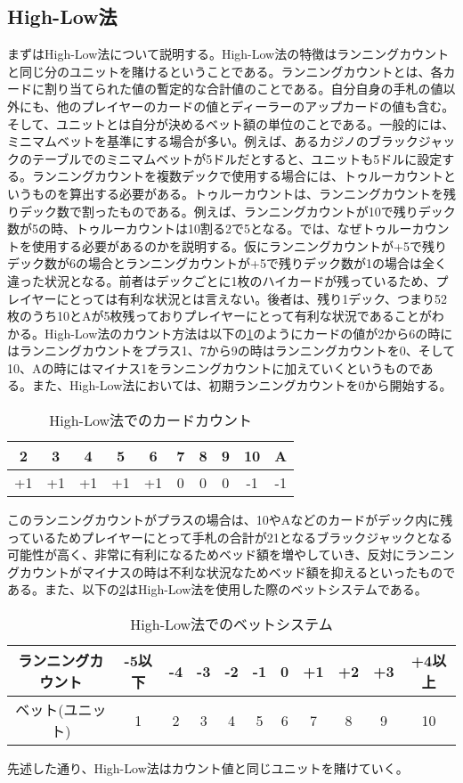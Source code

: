 \subsection{High-Low法}
まずはHigh-Low法について説明する。High-Low法の特徴はランニングカウントと同じ分のユニットを賭けるということである。ランニングカウントとは、各カードに割り当てられた値の暫定的な合計値のことである。自分自身の手札の値以外にも、他のプレイヤーのカードの値とディーラーのアップカードの値も含む。そして、ユニットとは自分が決めるベット額の単位のことである。一般的には、ミニマムベットを基準にする場合が多い。例えば、あるカジノのブラックジャックのテーブルでのミニマムベットが5ドルだとすると、ユニットも5ドルに設定する。ランニングカウントを複数デックで使用する場合には、トゥルーカウントというものを算出する必要がある。トゥルーカウントは、ランニングカウントを残りデック数で割ったものである。例えば、ランニングカウントが10で残りデック数が5の時、トゥルーカウントは10割る2で5となる。では、なぜトゥルーカウントを使用する必要があるのかを説明する。仮にランニングカウントが+5で残りデック数が6の場合とランニングカウントが+5で残りデック数が1の場合は全く違った状況となる。前者はデックごとに1枚のハイカードが残っているため、プレイヤーにとっては有利な状況とは言えない。後者は、残り1デック、つまり52枚のうち10とAが5枚残っておりプレイヤーにとって有利な状況であることがわかる。High-Low法のカウント方法は以下の\ref{hlc}のようにカードの値が2から6の時にはランニングカウントをプラス1、7から9の時はランニングカウントを0、そして10、Aの時にはマイナス1をランニングカウントに加えていくというものである。また、High-Low法においては、初期ランニングカウントを0から開始する。
\begin{table}[h]
\centering
\caption{High-Low法でのカードカウント\label{hlc}}
\begin{tabular}{|c|c|c|c|c|c|c|c|c|c|}
\hline
2&3&4&5&6&7&8&9&10&A \\ \hline
+1&+1&+1&+1&+1&0&0&0&-1&-1 \\ \hline
\end{tabular}
\end{table}
このランニングカウントがプラスの場合は、10やAなどのカードがデック内に残っているためプレイヤーにとって手札の合計が21となるブラックジャックとなる可能性が高く、非常に有利になるためベッド額を増やしていき、反対にランニングカウントがマイナスの時は不利な状況なためベッド額を抑えるといったものである。また、以下の\ref{hlb}はHigh-Low法を使用した際のベットシステムである。
\begin{table}[h]
\centering
\caption{High-Low法でのベットシステム\label{hlb}}
\begin{tabular}{|c|c|c|c|c|c|c|c|c|c|c|}
\hline
ランニングカウント&-5以下&-4&-3&-2&-1&0&+1&+2&+3&+4以上 \\ \hline
ベット(ユニット)&1&2&3&4&5&6&7&8&9&10 \\ \hline
\end{tabular}
\end{table}
先述した通り、High-Low法はカウント値と同じユニットを賭けていく。

